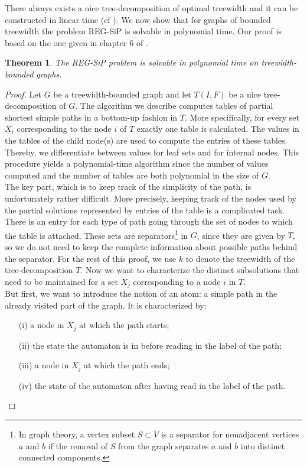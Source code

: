 \documentclass[]{article}
\newtheorem{theorem}{Theorem}[section]
\numberwithin{equation}{section}
\begin{document}
There always exists a nice tree-decomposition of optimal treewidth and it can be constructed in linear time (cf \cite{Bo92}). We now show that for graphs of bounded treewidth the problem REG-SiP is solvable in polynomial time. Our proof is based on the one given in chapter 6 of \cite{BJM00}.

\begin{theorem}
	The REG-SiP problem is solvable in polynomial time on treewidth-bounded graphs.
\end{theorem}

\begin{proof}
	Let $G$ be a treewidth-bounded graph and let $T(I,F)$ be a nice tree-decomposition of $G$. The algorithm we describe computes tables of partial shortest simple paths in a bottom-up fashion in $T$. More specifically, for every set $X_i$ corresponding to the node $i$ of $T$ exactly one table is calculated. The values in the tables of the child node(s) are used to compute the entries of these tables. Thereby, we differentiate between values for leaf sets and for internal nodes. This procedure yields a polynomial-time algorithm since the number of values computed and the number of tables are both polynomial in the size of $G$.\\
	
	The key part, which is to keep track of the simplicity of the path, is unfortunately rather difficult. More precisely, keeping track of the nodes used by the partial solutions represented by entries of the table is a complicated task. There is an entry for each type of path going through the set of nodes to which the table is attached. These sets are separators\footnote{In graph theory, a vertex subset $S\subset V$ is a separator for nonadjacent vertices $a$ and $b$ if the removal of $S$ from the graph separates $a$ and $b$ into distinct connected components.} in $G$, since they are given by $T$, so we do not need to keep the complete information about possible paths behind the separator. For the rest of this proof, we use $k$ to denote the treewidth of the tree-decomposition $T$. Now we want to characterize the distinct subsolutions that need to be maintained for a set $X_j$ corresponding to a node $i$ in $T$.\\
	
	But first, we want to introduce the notion of an atom: a simple path in the already visited part of the graph. It is characterized by:
	
	\begin{enumerate}
		\item[(i)] a node in $X_j$ at which the path starts;
		\item[(ii)] the state the automaton is in before reading in the label of the path;
		\item[(iii)] a node in $X_j$ at which the path ends;
		\item[(iv)] the state of the automaton after having read in the label of the path.
	\end{enumerate}
	

\end{proof}
\end{document}
